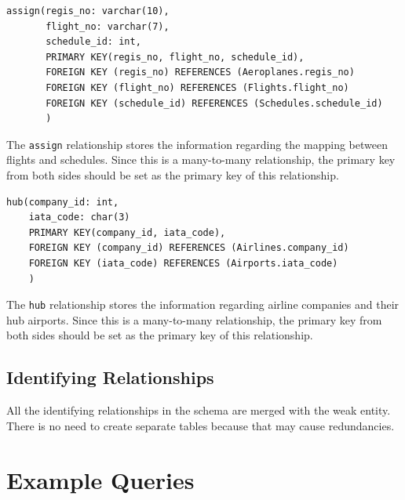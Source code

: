\documentclass{article}
\begin{document}
	\begin{lstlisting}[keepspaces=true]		
assign(regis_no: varchar(10),
       flight_no: varchar(7),
       schedule_id: int,
       PRIMARY KEY(regis_no, flight_no, schedule_id),
       FOREIGN KEY (regis_no) REFERENCES (Aeroplanes.regis_no)
       FOREIGN KEY (flight_no) REFERENCES (Flights.flight_no)
       FOREIGN KEY (schedule_id) REFERENCES (Schedules.schedule_id)
       )
	\end{lstlisting}    
	The \texttt{assign} relationship stores the information regarding the mapping between flights and schedules. Since this is a many-to-many relationship, the primary key from both sides should be set as the primary key of this relationship.

	\begin{lstlisting}[keepspaces=true]	
hub(company_id: int,
    iata_code: char(3)
    PRIMARY KEY(company_id, iata_code),
    FOREIGN KEY (company_id) REFERENCES (Airlines.company_id)
    FOREIGN KEY (iata_code) REFERENCES (Airports.iata_code)
    )
	\end{lstlisting}    
	The \texttt{hub} relationship stores the information regarding airline companies and their hub airports. Since this is a many-to-many relationship, the primary key from both sides should be set as the primary key of this relationship.

	\subsection{Identifying Relationships}
	
	All the identifying relationships in the schema are merged with the weak entity. There is no need to create separate tables because that may cause redundancies.
	
	\section{Example Queries}
	
\end{document}
